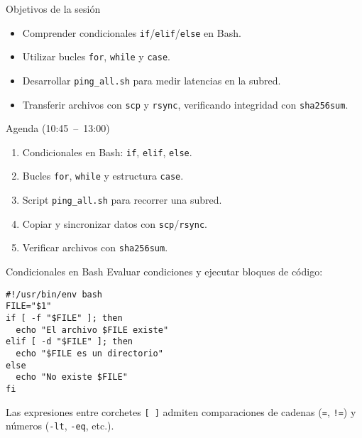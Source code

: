 \documentclass[aspectratio=169,professionalfonts]{beamer}
\begin{document}
\begin{frame}[fragile]{Objetivos de la sesión}
  \begin{itemize}
    \item Comprender condicionales \texttt{if}/\texttt{elif}/\texttt{else} en Bash.
    \item Utilizar bucles \texttt{for}, \texttt{while} y \texttt{case}.
    \item Desarrollar \texttt{ping\_all.sh} para medir latencias en la subred.
    \item Transferir archivos con \texttt{scp} y \texttt{rsync}, verificando integridad con \texttt{sha256sum}.
  \end{itemize}
\end{frame}

\begin{frame}[fragile]{Agenda (10:45 – 13:00)}
  \begin{enumerate}
    \item Condicionales en Bash: \texttt{if}, \texttt{elif}, \texttt{else}.
    \item Bucles \texttt{for}, \texttt{while} y estructura \texttt{case}.
    \item Script \texttt{ping\_all.sh} para recorrer una subred.
    \item Copiar y sincronizar datos con \texttt{scp}/\texttt{rsync}.
    \item Verificar archivos con \texttt{sha256sum}.
  \end{enumerate}
\end{frame}

\begin{frame}[fragile]{Condicionales en Bash}
  Evaluar condiciones y ejecutar bloques de código:
  \begin{verbatim}
#!/usr/bin/env bash
FILE="$1"
if [ -f "$FILE" ]; then
  echo "El archivo $FILE existe"
elif [ -d "$FILE" ]; then
  echo "$FILE es un directorio"
else
  echo "No existe $FILE"
fi
  \end{verbatim}
  \begin{infobox}
  Las expresiones entre corchetes \texttt{[ ]} admiten comparaciones de cadenas (\texttt{=}, \texttt{!=}) y números (\texttt{-lt}, \texttt{-eq}, etc.).
  \end{infobox}
\end{frame}
\end{document}
